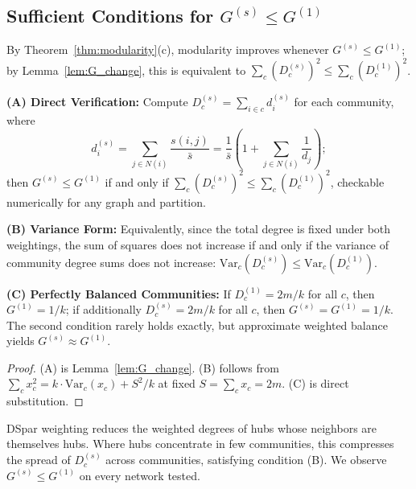 \subsection{\texorpdfstring{Sufficient Conditions for $G^{(s)} \leq G^{(1)}$}{Sufficient Conditions for G(s) <= G(1)}}

By Theorem~\ref{thm:modularity}(c), modularity improves whenever $G^{(s)} \leq G^{(1)}$; by Lemma~\ref{lem:G_change}, this is equivalent to $\sum_c (D_c^{(s)})^2 \leq \sum_c (D_c^{(1)})^2$.

\begin{proposition}
\label{prop:alternatives}

\textbf{(A) Direct Verification:} Compute $D_c^{(s)} = \sum_{i \in c} d_i^{(s)}$ for each community, where
\begin{equation}
d_i^{(s)} = \sum_{j \in N(i)} \frac{s(i,j)}{\bar{s}} = \frac{1}{\bar{s}}\left(1 + \sum_{j \in N(i)} \frac{1}{d_j}\right);
\end{equation}
then $G^{(s)} \leq G^{(1)}$ if and only if $\sum_{c} (D_c^{(s)})^2 \leq \sum_{c} (D_c^{(1)})^2$, checkable numerically for any graph and partition.

\textbf{(B) Variance Form:} Equivalently, since the total degree is fixed under both weightings, the sum of squares does not increase if and only if the variance of community degree sums does not increase: $\text{Var}_c(D_c^{(s)}) \leq \text{Var}_c(D_c^{(1)})$.

\textbf{(C) Perfectly Balanced Communities:} If $D_c^{(1)} = 2m/k$ for all $c$, then $G^{(1)} = 1/k$; if additionally $D_c^{(s)} = 2m/k$ for all $c$, then $G^{(s)} = G^{(1)} = 1/k$. The second condition rarely holds exactly, but approximate weighted balance yields $G^{(s)} \approx G^{(1)}$.
\end{proposition}

\begin{proof}
(A) is Lemma~\ref{lem:G_change}. (B) follows from $\sum_c x_c^2 = k \cdot \text{Var}_c(x_c) + S^2/k$ at fixed $S = \sum_c x_c = 2m$. (C) is direct substitution.
\end{proof}

\begin{remark}
DSpar weighting reduces the weighted degrees of hubs whose neighbors are themselves hubs. Where hubs concentrate in few communities, this compresses the spread of $D_c^{(s)}$ across communities, satisfying condition (B). We observe $G^{(s)} \leq G^{(1)}$ on every network tested.
\end{remark}


